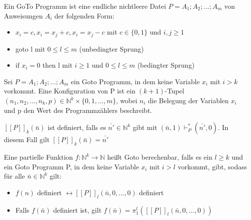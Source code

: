 \documentclass[avery5371]{flashcards}
\begin{document}
\begin{flashcard}[Definition]{Ein GoTo Programm} 
ist eine endliche nichtleere Datei $P=A_1;A_2;...;A_m$ von Anweisungen $A_i$ der folgenden Form:
\begin{itemize}
\item $x_i=c, x_i=x_j+c, x_i=x_j-c$ mit $c\in\{0,1\}$ und $i,j\geq 1$
\item goto l mit $0\leq l\leq m$ (unbedingter Sprung)
\item if $x_i=0$ then l mit $i\geq 1$ und $0\leq l \leq m$ (bedingter Sprung) 
\end{itemize}
\end{flashcard}

\begin{flashcard}[Definition]{} Sei $P=A_1;A_2;...;A_m$ ein Goto Programm, in dem keine Variable $x_i$ mit $i>k$ vorkommt. Eine Konfiguration von P ist ein $(k+1)$-Tupel $(n_1,n_2,...,n_k,p)\in\mathbb{N}^k\times\{0,1,...,m\}$, wobei $n_i$ die Belegung der Variablen $x_i$ und p den Wert des Programmzählers beschreibt.
\end{flashcard}

\begin{flashcard}[Definition]{} $[[P]]_k(\bar{n})$ ist definiert, falls es $\bar{n'}\in\mathbb{N}^k$ gibt mit $(\bar{n},1)\vdash_P^* (\bar{n'},0)$. In diesem Fall gilt $[[P]]_k(\bar{n})=\bar{n'}$
\end{flashcard}

\begin{flashcard}[Definition]{ Eine partielle Funktion $f:\mathbb{N}^k\rightarrow\mathbb{N}$ heißt Goto berechenbar,} falls es ein $l\geq k$ und ein Goto Programm P, in dem keine Variable $x_i$ mit $i>l$ vorkommt, gibt, sodass für alle $\bar{n}\in\mathbb{N}^k$ gilt:\begin{itemize}
\item $f(n)$ definiert $\leftrightarrow [[P]]_l(\bar{n},0,...,0)$ definiert
\item Falls $f(\bar{n})$ definiert ist, gilt $f(\bar{n})=\pi_1^l ([[P]]_l(\bar{n},0,...,0))$
    \end{itemize}
\end{flashcard}
\end{document}
